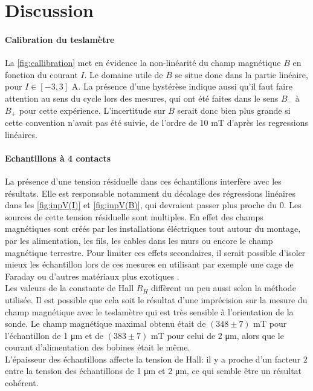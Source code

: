 \section{Discussion}

\paragraph*{Calibration du teslamètre}
La \autoref{fig:callibration} met en évidence la non-linéarité du champ magnétique \(B\) en fonction du courant \(I\). Le domaine utile de \(B\) se situe donc dans la partie linéaire, pour \(I \in [-3, 3]\) \si{\ampere}. La présence d'une hystérèse indique aussi qu'il faut faire attention au sens du cycle lors des mesures, qui ont été faites dans le sens \(B_-\) à \(B_+\) pour cette expérience. L'incertitude sur \(B\) serait donc bien plus grande si cette convention n'avait pas été suivie, de l'ordre de 10 \si{\milli\tesla} d'après les regressions linéaires.

\paragraph*{Echantillons à 4 contacts}
La présence d'une tension résiduelle dans ces échantillons interfère avec les résultats. Elle est responsable notamment du décalage des régressions linéaires dans les \autoref{fig:inpV(I)} et \autoref{fig:inpV(B)}, qui devraient passer plus proche du 0. Les sources de cette tension résiduelle sont multiples. En effet des champs magnétiques sont créés par les installations éléctriques tout autour du montage, par les alimentation, les fils, les cables dans les murs ou encore le champ magnétique terrestre. Pour limiter ces effets secondaires, il serait possible d'isoler mieux les échantillon lors de ces mesures en utilisant par exemple une cage de Faraday ou d'autres matériaux plus exotiques \cite{em_shielding}.\\
Les valeurs de la constante de Hall \(R_H\) diffèrent un peu aussi selon la méthode utilisée. Il est possible que cela soit le résultat d'une imprécision sur la mesure du champ magnétique avec le teslamètre qui est très sensible à l'orientation de la sonde. Le champ magnétique maximal obtenu était de \((348 \pm 7)\) \si{\milli\tesla} pour l'échantillon de 1 \si{\micro\meter} et de \((383 \pm 7)\) \si{\milli\tesla} pour celui de 2 \si{\micro\meter}, alors que le courant d'alimentation des bobines était le même.\\
L'épaisseur des échantillons affecte la tension de Hall: il y a proche d'un facteur 2 entre la tension des échantillons de 1 \si{\micro\meter} et 2 \si{\micro\meter}, ce qui semble être un résultat cohérent.

